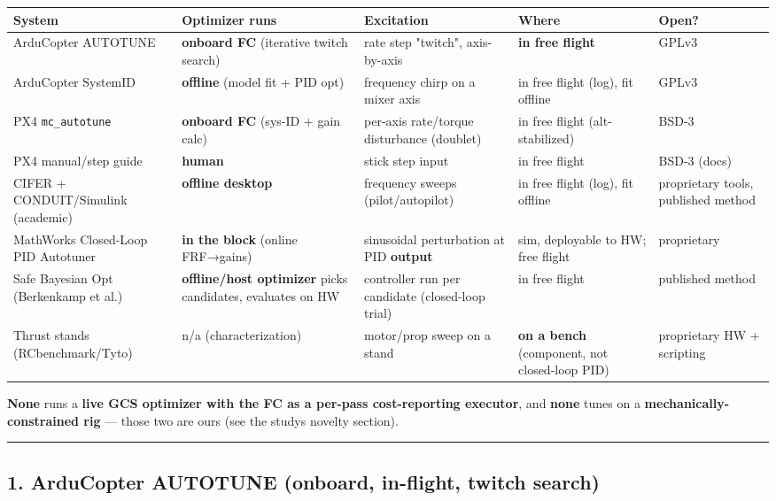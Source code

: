 \documentclass[
  11pt,
]{article}
\begin{document}
\begin{longtable}[]{@{}lllll@{}}
\toprule\noalign{}
System & Optimizer runs & Excitation & Where & Open? \\
\midrule\noalign{}
\endhead
\bottomrule\noalign{}
\endlastfoot
ArduCopter AUTOTUNE & \textbf{onboard FC} (iterative twitch search) &
rate step "twitch", axis-by-axis & \textbf{in free flight} & GPLv3 \\
ArduCopter SystemID & \textbf{offline} (model fit + PID opt) & frequency
chirp on a mixer axis & in free flight (log), fit offline & GPLv3 \\
PX4 \texttt{mc\_autotune} & \textbf{onboard FC} (sys-ID + gain calc) &
per-axis rate/torque disturbance (doublet) & in free flight
(alt-stabilized) & BSD-3 \\
PX4 manual/step guide & \textbf{human} & stick step input & in free
flight & BSD-3 (docs) \\
CIFER + CONDUIT/Simulink (academic) & \textbf{offline desktop} &
frequency sweeps (pilot/autopilot) & in free flight (log), fit offline &
proprietary tools, published method \\
MathWorks Closed-Loop PID Autotuner & \textbf{in the block} (online
FRF→gains) & sinusoidal perturbation at PID \textbf{output} & sim,
deployable to HW; free flight & proprietary \\
Safe Bayesian Opt (Berkenkamp et al.) & \textbf{offline/host optimizer}
picks candidates, evaluates on HW & controller run per candidate
(closed-loop trial) & in free flight & published method \\
Thrust stands (RCbenchmark/Tyto) & n/a (characterization) & motor/prop
sweep on a stand & \textbf{on a bench} (component, not closed-loop PID)
& proprietary HW + scripting \\
\end{longtable}

\textbf{None} runs a \textbf{live GCS optimizer with the FC as a
per-pass cost-reporting executor}, and \textbf{none} tunes on a
\textbf{mechanically-constrained rig} --- those two are ours (see the
study\textquotesingle s novelty section).

\begin{center}\rule{0.5\linewidth}{0.5pt}\end{center}

\hypertarget{1-arducopter-autotune-onboard-in-flight-twitch-search}{%
\subsection{1. ArduCopter AUTOTUNE (onboard, in-flight, twitch
search)}\label{1-arducopter-autotune-onboard-in-flight-twitch-search}}
\end{document}

